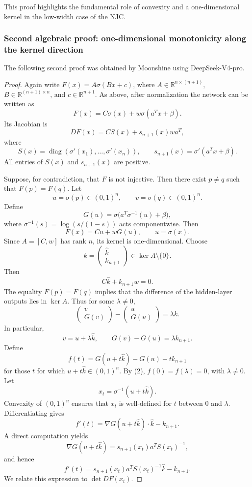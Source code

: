 \documentclass[a4paper,11pt]{article}
\theoremstyle{plain}
\theoremstyle{definition}
\theoremstyle{remark}
\DeclareMathOperator{\diag}{diag}
\begin{document}
This proof highlights the fundamental role of convexity and a one-dimensional kernel in the low-width case of the NJC.

\subsubsection{Second algebraic proof: one-dimensional monotonicity along the kernel direction}

The following second proof was obtained by Moonshine using DeepSeek-V4-pro.

\begin{proof}
Again write \(F(x)=A\sigma(Bx+c)\), where \(A\in\mathbb R^{n\times(n+1)}\), \(B\in\mathbb R^{(n+1)\times n}\), and \(c\in\mathbb R^{n+1}\). As above, after normalization the network can be written as
\[
F(x)=C\sigma(x)+w\sigma(a^Tx+\beta).
\]
Its Jacobian is
\[
DF(x)=C S(x)+s_{n+1}(x)w a^T,
\]
where
\[
S(x)=\diag(\sigma'(x_1),\ldots,\sigma'(x_n)),
\qquad
s_{n+1}(x)=\sigma'(a^Tx+\beta).
\]
All entries of \(S(x)\) and \(s_{n+1}(x)\) are positive.

Suppose, for contradiction, that \(F\) is not injective. Then there exist \(p\ne q\) such that \(F(p)=F(q)\). Let
\[
u=\sigma(p)\in(0,1)^n,
\qquad
v=\sigma(q)\in(0,1)^n.
\]
Define
\[
G(u)=\sigma\bigl(a^T\sigma^{-1}(u)+\beta\bigr),
\]
where \(\sigma^{-1}(s)=\log(s/(1-s))\) acts componentwise. Then
\[
F(x)=C u+wG(u),
\qquad u=\sigma(x).
\]
Since \(A=[C,w]\) has rank \(n\), its kernel is one-dimensional. Choose
\[
k=\begin{pmatrix}\widehat k\\ k_{n+1}\end{pmatrix}\in\ker A\setminus\{0\}.
\]
Then
\[
C\widehat k+k_{n+1}w=0. \tag{1}
\]
The equality \(F(p)=F(q)\) implies that the difference of the hidden-layer outputs lies in \(\ker A\). Thus for some \(\lambda\ne0\),
\[
\begin{pmatrix}v\\G(v)\end{pmatrix}-\begin{pmatrix}u\\G(u)\end{pmatrix}=\lambda k.
\]
In particular,
\[
v=u+\lambda\widehat k,
\qquad
G(v)-G(u)=\lambda k_{n+1}. \tag{2}
\]
Define
\[
f(t)=G(u+t\widehat k)-G(u)-t k_{n+1}
\]
for those \(t\) for which \(u+t\widehat k\in(0,1)^n\). By (2), \(f(0)=f(\lambda)=0\), with \(\lambda\ne0\). Let
\[
x_t=\sigma^{-1}(u+t\widehat k).
\]
Convexity of \((0,1)^n\) ensures that \(x_t\) is well-defined for \(t\) between \(0\) and \(\lambda\). Differentiating gives
\[
f'(t)=\nabla G(u+t\widehat k)\cdot\widehat k-k_{n+1}.
\]
A direct computation yields
\[
\nabla G(u+t\widehat k)=s_{n+1}(x_t)a^T S(x_t)^{-1},
\]
and hence
\[
f'(t)=s_{n+1}(x_t)a^T S(x_t)^{-1}\widehat k-k_{n+1}. \tag{3}
\]
We relate this expression to \(\det DF(x_t)\).


\end{proof}
\end{document}
